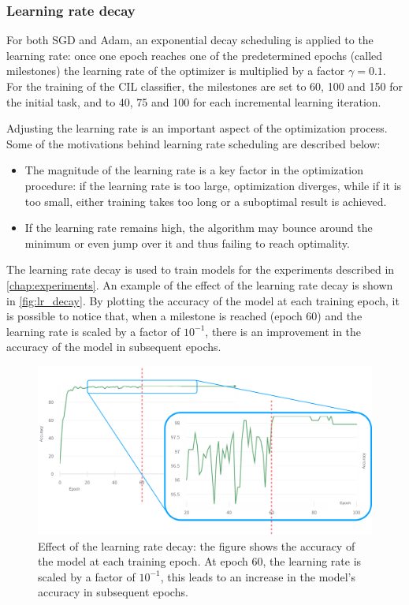 \subsubsection{Learning rate decay}
For both SGD and Adam, an exponential decay scheduling is applied to the learning rate: once one epoch reaches one of the predetermined epochs (called milestones) the learning rate of the optimizer is multiplied by a factor $\gamma = 0.1$. For the training of the CIL classifier, the milestones are set to 60, 100 and 150 for the initial task, and to 40, 75 and 100 for each incremental learning iteration.

Adjusting the learning rate is an important aspect of the optimization process. Some of the motivations behind learning rate scheduling are described below:
\begin{itemize}
    \item The magnitude of the learning rate is a key factor in the optimization procedure: if the learning rate is too large, optimization diverges, while if it is too small, either training takes too long or a suboptimal result is achieved.
    \item If the learning rate remains high, the algorithm may bounce around the minimum or even jump over it and thus failing to reach optimality. 
\end{itemize}

The learning rate decay is used to train models for the experiments described in \autoref{chap:experiments}. An example of the effect of the learning rate decay is shown in \autoref{fig:lr_decay}.
By plotting the accuracy of the model at each training epoch, it is possible to notice that, when a milestone is reached (epoch 60) and the learning rate is scaled by a factor of $10^{-1}$, there is an improvement in the accuracy of the model in subsequent epochs.

\begin{figure}[H]
	\centering

    \begin{center}
        \includegraphics[width=\columnwidth]{images/lr_decay.drawio.png}
    \end{center}

	\caption{Effect of the learning rate decay: the figure shows the accuracy of the model at each training epoch. At epoch 60, the learning rate is scaled by a factor of $10^{-1}$, this leads to an increase in the model's accuracy in subsequent epochs.}
	\label{fig:lr_decay}%
\end{figure}


